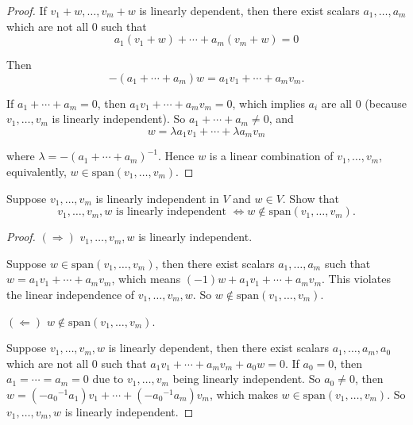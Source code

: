 \begin{proof}
    If $v_{1} + w, \ldots, v_{m} + w$ is linearly dependent, then there exist scalars $a_{1}, \ldots, a_{m}$ which are not all $0$ such that
    \[
        a_{1}(v_{1} + w) + \cdots + a_{m}(v_{m} + w) = 0
    \]

    Then
    \[
        -(a_{1} + \cdots + a_{m})w = a_{1}v_{1} + \cdots + a_{m}v_{m}.
    \]

    If $a_{1} + \cdots + a_{m} = 0$, then $a_{1}v_{1} + \cdots + a_{m}v_{m} = 0$, which implies $a_{i}$ are all $0$ (because $v_{1}, \ldots, v_{m}$ is linearly independent). So $a_{1} + \cdots + a_{m}\ne 0$, and
    \[
        w = \lambda a_{1}v_{1} + \cdots + \lambda a_{m}v_{m}
    \]

    where $\lambda = -{(a_{1} + \cdots + a_{m})}^{-1}$. Hence $w$ is a linear combination of $v_{1}, \ldots, v_{m}$, equivalently, $w\in\text{span}(v_{1}, \ldots, v_{m})$.
\end{proof}

\begin{exercise}\label{chapter2:sectionA:exercise13}
    Suppose $v_{1}, \ldots, v_{m}$ is linearly independent in $V$ and $w\in V$. Show that
    \[
        v_{1}, \ldots, v_{m}, w \text{ is linearly independent }\Longleftrightarrow w\notin \text{span}(v_{1}, \ldots, v_{m}).
    \]
\end{exercise}

\begin{proof}
    $(\Rightarrow)$ $v_{1}, \ldots, v_{m}, w$ is linearly independent.

    Suppose $w\in\text{span}(v_{1}, \ldots, v_{m})$, then there exist scalars $a_{1}, \ldots, a_{m}$ such that $w = a_{1}v_{1} + \cdots + a_{m}v_{m}$, which means $(-1)w + a_{1}v_{1} + \cdots + a_{m}v_{m}$. This violates the linear independence of $v_{1}, \ldots, v_{m}, w$. So $w\notin \text{span}(v_{1}, \ldots, v_{m})$.

    $(\Leftarrow)$ $w\notin \text{span}(v_{1}, \ldots, v_{m})$.

    Suppose $v_{1}, \ldots, v_{m}, w$ is linearly dependent, then there exist scalars $a_{1}, \ldots, a_{m}, a_{0}$ which are not all $0$ such that $a_{1}v_{1} + \cdots + a_{m}v_{m} + a_{0}w = 0$. If $a_{0} = 0$, then $a_{1} = \cdots = a_{m} = 0$ due to $v_{1}, \ldots, v_{m}$ being linearly independent. So $a_{0}\ne 0$, then $w = (-{a_{0}}^{-1}a_{1})v_{1} + \cdots + (-{a_{0}}^{-1}a_{m})v_{m}$, which makes $w\in\text{span}(v_{1}, \ldots, v_{m})$. So $v_{1}, \ldots, v_{m}, w$ is linearly independent.
\end{proof}


